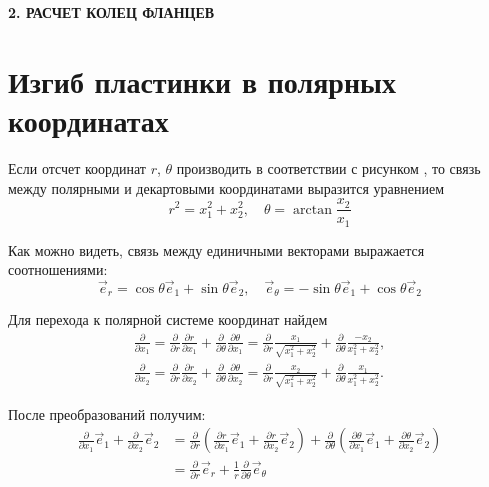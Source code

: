 \newpage
\begin{center}
  \textbf{\large 2. РАСЧЕТ КОЛЕЦ ФЛАНЦЕВ}
\end{center}


\section{Изгиб пластинки в полярных координатах}
\label{PlBending}

Если отсчет координат $r$, $\theta$ производить в соответствии с рисунком , то связь между полярными и декартовыми координатами выразится уравнением
\begin{equation}
  \label{cartesian-polar}
  r^2=x_1^2+x_2^2, \quad \theta=\arctan \frac{x_2}{x_1}
\end{equation}

Как можно видеть, связь между единичными векторами выражается соотношениями:
\begin{equation}
  \label{PlBending-eq2}
  {\vec e}_r= \cos{\theta} {\vec e}_1+\sin{\theta} {\vec e}_2, \quad {\vec e}_{\theta}= -\sin{\theta} {\vec e}_1+\cos{\theta} {\vec e}_2
\end{equation}

Для перехода к полярной системе координат найдем
\begin{equation}
  \label{PlBending-eq3}
  \begin{split}
    \frac{\partial}{\partial x_1}=\frac{\partial}{\partial r}\frac{\partial r}{\partial x_1}+\frac{\partial}{\partial \theta}\frac{\partial \theta}{\partial x_1}=\frac{\partial}{\partial r}\frac{x_1}{\sqrt{x_1^2+x_2^2}}+\frac{\partial}{\partial \theta}\frac{-x_2}{x_1^2+x_2^2},\\
    \frac{\partial}{\partial x_2}=\frac{\partial}{\partial r}\frac{\partial r}{\partial x_2}+\frac{\partial}{\partial \theta}\frac{\partial \theta}{\partial x_2}=\frac{\partial}{\partial r}\frac{x_2}{\sqrt{x_1^2+x_2^2}}+\frac{\partial}{\partial \theta}\frac{x_1}{x_1^2+x_2^2}.  
  \end{split}
\end{equation}

После преобразований получим:
\begin{equation}
  \label{PlBending-eq4}
  \begin{split}
    \frac{\partial}{\partial x_1} {\vec e}_1 + \frac{\partial}{\partial x_2} {\vec e}_2 &=\frac{\partial}{\partial r} \left ( \frac{\partial r}{\partial x_1}{\vec e}_1 +\frac{\partial r}{\partial x_2}{\vec e}_2 \right ) + \frac{\partial}{\partial \theta} \left ( \frac{\partial \theta}{\partial x_1}{\vec e}_1 +\frac{\partial \theta}{\partial x_2}{\vec e}_2 \right )\\  
    &=\frac{\partial}{\partial r} {\vec e}_r +\frac{1}{r} \frac{\partial}{\partial \theta} {\vec e}_{\theta}
  \end{split}
  \end{equation}

